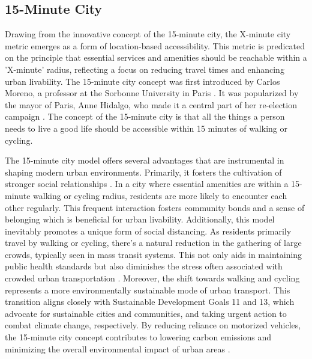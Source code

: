 \subsection{15-Minute City}
\label{subsec:15_minute_city}

Drawing from the innovative concept of the 15-minute city, the X-minute city metric emerges as a form of location-based accessibility. 
This metric is predicated on the principle that essential services and amenities should be reachable within a 'X-minute' radius, reflecting a focus on reducing travel times and enhancing urban livability.
The 15-minute city concept was first introduced by Carlos Moreno, a professor at the Sorbonne University in Paris \cite{morenoIntroducing15MinuteCity2021}.
It was popularized by the mayor of Paris, Anne Hidalgo, who made it a central part of her re-election campaign \cite{gongadzeParisVision15Minute2023}.
The concept of the 15-minute city is that all the things a person needs to live a good life should be accessible within 15 minutes of walking or cycling.

The 15-minute city model offers several advantages that are instrumental in shaping modern urban environments.
Primarily, it fosters the cultivation of stronger social relationships .
In a city where essential amenities are within a 15-minute walking or cycling radius, residents are more likely to encounter each other regularly. 
This frequent interaction fosters community bonds and a sense of belonging which is beneficial for urban livability.
Additionally, this model inevitably promotes a unique form of social distancing. 
As residents primarily travel by walking or cycling, there's a natural reduction in the gathering of large crowds, typically seen in mass transit systems. 
This not only aids in maintaining public health standards but also diminishes the stress often associated with crowded urban transportation \cite{allamProximityBasedPlanning15Minute2020}.
Moreover, the shift towards walking and cycling represents a more environmentally sustainable mode of urban transport. 
This transition aligns closely with Sustainable Development Goals 11 and 13, which advocate for sustainable cities and communities, and taking urgent action to combat climate change, respectively. 
By reducing reliance on motorized vehicles, the 15-minute city concept contributes to lowering carbon emissions and minimizing the overall environmental impact of urban areas .

